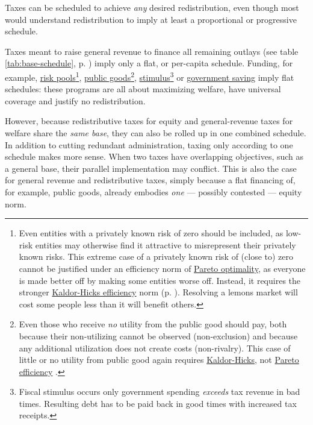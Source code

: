 \begin{description}
	Taxes can be scheduled to achieve \emph{any} desired redistribution, even though most would understand redistribution to imply at least a proportional or progressive schedule. 
	
	Taxes meant to raise general revenue to finance all remaining outlays (see table \ref{tab:base-schedule}, p. \pageref{tab:base-schedule}) imply only a flat, or per-capita schedule. Funding, for example, \hyperref[sec:adverseselection]{risk pools}\footnote{
		Even entities with a privately known risk of zero should be included, as low-risk entities may otherwise find it attractive to misrepresent their privately known risks. This extreme case of a privately known risk of (close to) zero cannot be justified under an efficiency norm of \hyperref[sec:Pareto]{Pareto optimality}, as everyone is made better off by making some entities worse off. Instead, it requires the stronger \hyperref[sec:KaldorHicks]{Kaldor-Hicks efficiency} norm (p. \pageref{sec:Efficiency})\citep{Kaldor1939,Hicks1939}. Resolving a lemons market will cost some people less than it will benefit others.}, 
	\hyperref[sec:publicgood]{public goods}\footnote{
		Even those who receive \emph{no} utility from the public good should pay, both because their non-utilizing cannot be observed (non-exclusion) and because any additional utilization does not create costs (non-rivalry). This case of little or no utility from public good again requires \hyperref[sec:KaldorHicks]{Kaldor-Hicks}, not \hyperref[sec:Pareto]{Pareto efficiency} \citep{Kaldor1939,Hicks1939}.}, 
	\hyperref[sec:fiscalstimulus]{stimulus}\footnote{
		Fiscal stimulus occurs only government spending \emph{exceeds} tax revenue in bad times. Resulting debt has to be paid back in good times with increased tax receipts.} 
	or \hyperref[sec:governmentsaves]{government saving} imply flat schedules: these programs are all about maximizing welfare, have universal coverage and justify no redistribution. 
	
	However, %
	 \label{sec:redistributionandrevenueareone} because redistributive taxes for equity and general-revenue taxes for welfare share the \emph{same base}, they can also be rolled up in one combined schedule. In addition to cutting redundant administration, taxing only according to one schedule makes more sense. When two taxes have overlapping objectives, such as a general base, their parallel implementation may conflict. This is also the case for general revenue and redistributive taxes, simply because a flat financing of, for example, public goods, already embodies \emph{one} --- possibly contested --- equity norm. 
	
\end{description}

